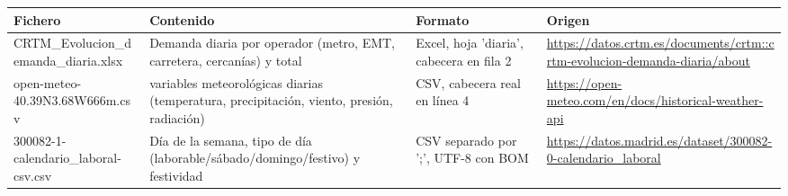 \begin{tabular}{>{\raggedright\arraybackslash}p{3.5cm}>{\raggedright\arraybackslash}p{4.6cm}>{\raggedright\arraybackslash}p{2.8cm}>{\raggedright\arraybackslash}p{3.6cm}}
\toprule
\rowcolor{naranja}
\textbf{Fichero} & \textbf{Contenido} & \textbf{Formato} & \textbf{Origen} \\
\midrule
\rowcolor{filaclara} CRTM\_\allowbreak{}Evolucion\_\allowbreak{}demanda\_\allowbreak{}diaria.xlsx & Demanda diaria por operador (metro, EMT, carretera, cercanías) y total & Excel, hoja 'diaria', cabecera en fila 2 & \url{https://datos.crtm.es/documents/crtm::crtm-evolucion-demanda-diaria/about} \\
open-meteo-40.39N3.68W666m.csv & 22 variables meteorológicas diarias (temperatura, precipitación, viento, presión, radiación) & CSV, cabecera real en línea 4 & \url{https://open-meteo.com/en/docs/historical-weather-api} \\
\rowcolor{filaclara} 300082-1-calendario\_\allowbreak{}laboral-csv.csv & Día de la semana, tipo de día (laborable/\allowbreak{}sábado/\allowbreak{}domingo/\allowbreak{}festivo) y festividad & CSV separado por ';', UTF-8 con BOM & \url{https://datos.madrid.es/dataset/300082-0-calendario_laboral} \\
\bottomrule
\end{tabular}
